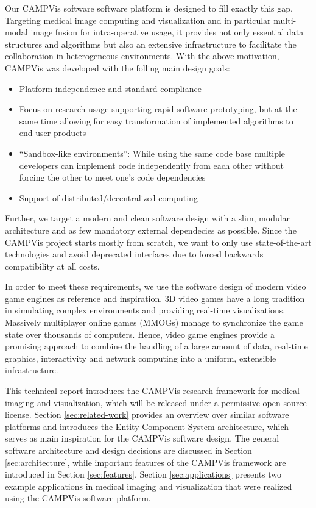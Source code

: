 Our CAMPVis software software platform is designed to fill exactly this gap.
Targeting medical image computing and visualization and in particular multi-modal image fusion for intra-operative usage, it provides not only essential data structures and algorithms but also an extensive infrastructure to facilitate the collaboration in heterogeneous environments.
With the above motivation, CAMPVis was developed with the folling main design goals:
\begin{itemize}
	\item
	Platform-independence and standard compliance
	\item 
	Focus on research-usage supporting rapid software prototyping, but at the same time allowing for easy transformation of implemented algorithms to end-user products
	\item 
	``Sandbox-like environments'': While using the same code base multiple developers can implement code independently from each other without forcing the other to meet one's code dependencies 
	\item 
	Support of distributed/decentralized computing
\end{itemize}

Further, we target a modern and clean software design with a slim, modular architecture and as few mandatory external dependecies as possible.
Since the CAMPVis project starts mostly from scratch, we want to only use state-of-the-art technologies and avoid deprecated interfaces due to forced backwards compatibility at all costs.

In order to meet these requirements, we use the software design of modern video game engines as reference and inspiration. 
3D video games have a long tradition in simulating complex environments and providing real-time visualizations.
Massively multiplayer online games (MMOGs) manage to synchronize the game state over thousands of computers.
Hence, video game engines provide a promising approach to combine the handling of a large amount of data, real-time graphics, interactivity and network computing into a uniform, extensible infrastructure.

This technical report introduces the CAMPVis research framework for medical imaging and visualization, which will be released under a permissive open source license.
Section \ref{sec:related-work} provides an overview over similar software platforms and introduces the Entity Component System architecture, which serves as main inspiration for the CAMPVis software design.
The general software architecture and design decisions are discussed in Section \ref{sec:architecture}, while important features of the CAMPVis framework are introduced in Section \ref{sec:features}.
Section \ref{sec:applications} presents two example applications in medical imaging and visualization that were realized using the CAMPVis software platform.




